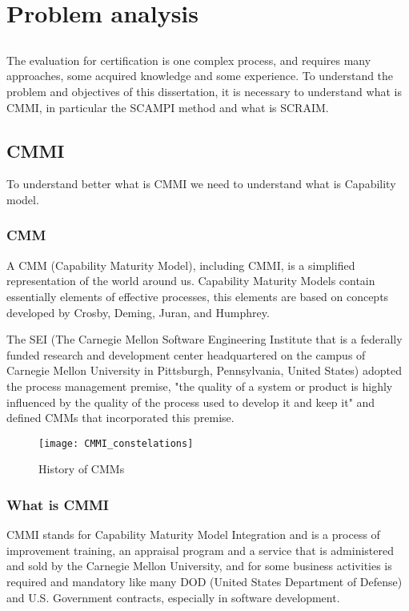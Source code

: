\chapter{Problem analysis} \label{chap:problem}

\section*{}

The evaluation for certification is one complex process, and requires many approaches, some acquired knowledge and some experience. To understand the problem and objectives of this dissertation, it is necessary to understand what is CMMI, in particular the SCAMPI method and what is SCRAIM.

\section{CMMI}

To understand better what is CMMI we need to understand what is Capability model.

\subsection{CMM}
A CMM (Capability Maturity Model), including CMMI, is a simplified representation of the world around us. Capability Maturity Models contain essentially elements of effective processes, this elements are based on concepts developed by Crosby, Deming, Juran, and Humphrey.

The SEI (The Carnegie Mellon Software Engineering Institute that is a federally funded research and development center headquartered on the campus of Carnegie Mellon University in Pittsburgh, Pennsylvania, United States) adopted the process management premise, "the quality of a system or product is highly influenced by the quality of the process used to develop it and keep it" and defined CMMs that incorporated this premise.
\begin{figure}[h]
	\begin{center}
		\leavevmode
		\texttt{[image: CMMI\_constelations]}
		\caption{History of CMMs}
		\label{fig:arch}
	\end{center}
\end{figure}

\subsection{What is CMMI}
CMMI stands for Capability Maturity Model Integration and is a process of improvement training, an appraisal program and a service that is administered and sold by the Carnegie Mellon University, and for some business activities is required and mandatory like many DOD (United States Department of Defense) and U.S. Government contracts, especially in software development.

